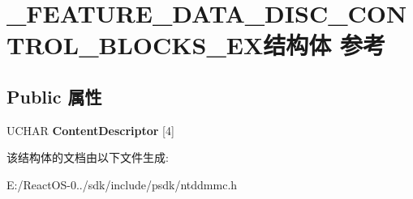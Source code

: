 \hypertarget{struct___f_e_a_t_u_r_e___d_a_t_a___d_i_s_c___c_o_n_t_r_o_l___b_l_o_c_k_s___e_x}{}\section{\+\_\+\+F\+E\+A\+T\+U\+R\+E\+\_\+\+D\+A\+T\+A\+\_\+\+D\+I\+S\+C\+\_\+\+C\+O\+N\+T\+R\+O\+L\+\_\+\+B\+L\+O\+C\+K\+S\+\_\+\+E\+X结构体 参考}
\label{struct___f_e_a_t_u_r_e___d_a_t_a___d_i_s_c___c_o_n_t_r_o_l___b_l_o_c_k_s___e_x}
\subsection*{Public 属性}
\begin{DoxyCompactItemize}
\item 
\mbox{\label{struct___f_e_a_t_u_r_e___d_a_t_a___d_i_s_c___c_o_n_t_r_o_l___b_l_o_c_k_s___e_x_abaf4e8febd94606de5ae178fd2e3ca91}} 
U\+C\+H\+AR {\bfseries Content\+Descriptor} \mbox{[}4\mbox{]}
\end{DoxyCompactItemize}


该结构体的文档由以下文件生成\+:\begin{DoxyCompactItemize}
\item 
E\+:/\+React\+O\+S-\/0../sdk/include/psdk/ntddmmc.\+h\end{DoxyCompactItemize}
